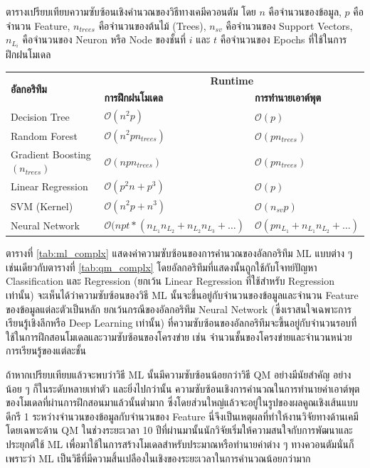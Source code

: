 \begin{adjustwidth}{-2.5 cm}{-2.5 cm}
    \centering
    \begin{threeparttable}[H]
    \caption{ตารางเปรียบเทียบความซับซ้อนเชิงคำนวณของวิธีทางเคมีควอนตัม\autocite{zotero-328} โดย $n$ คือจำนวนของข้อมูล, $p$ 
    คือจำนวน Feature, $n_{trees}$ คือจำนวนของต้นไม้ (Trees), $n_{sv}$ คือจำนวนของ Support Vectors, $n_{L_{i}}$ 
    คือจำนวนของ Neuron หรือ Node ของชั้นที่ $i$ และ $t$ คือจำนวนของ Epochs ที่ใช้ในการฝึกฝนโมเดล}
    \label{tab:ml_complx}
    \small
    \begin{tabular}{lll}\toprule
    \multirow{2}{*}{\textbf{อัลกอริทึม}} &\multicolumn{2}{c}{\textbf{Runtime}} \\\cmidrule{2-3}
    &\textbf{การฝึกฝนโมเดล} &\textbf{การทำนายเอาต์พุต}\\\midrule
    Decision Tree &$\mathcal{O}(n^{2}p)$ &$\mathcal{O}(p)$ \\
    Random Forest &$\mathcal{O}(n^{2}pn_{trees})$ &$\mathcal{O}(pn_{trees})$ \\
    Gradient Boosting $(n_{trees})$ &$\mathcal{O}(npn_{trees})$ &$\mathcal{O}(pn_{trees})$ \\
    Linear Regression &$\mathcal{O}(p^{2}n+p^{3})$ &$\mathcal{O}(p)$ \\
    SVM (Kernel) &$\mathcal{O}(n^{2}p+n^{3})$ &$\mathcal{O}(n_{sv}p)$ \\
    Neural Network &$\mathcal{O}(npt*(n_{L_{1}}n_{L_{2}}+ n_{L_{2}}n_{L_{3}} + \dots)$ &$\mathcal{O}(pn_{L_{1}} 
    + n_{L_{1}}n_{L_{2}}+ \dots)$ \\
    \bottomrule
    \end{tabular}
\end{threeparttable}
\end{adjustwidth}

ตารางที่ \ref{tab:ml_complx} แสดงค่าความซับซ้อนของการคำนวณของอัลกอริทึม ML แบบต่าง ๆ เช่นเดียวกับตารางที่ \ref{tab:qm_complx} โดยอัลกอริทึมที่แสดงนั้นถูกใช้กับโจทย์ปัญหา Classification และ Regression (ยกเว้น Linear Regression ที่ใช้สำหรับ Regression เท่านั้น) จะเห็นได้ว่าความซับซ้อนของวิธี ML นั้นจะขึ้นอยู่กับจำนวนของข้อมูลและจำนวน Feature ของข้อมูลแต่ละตัวเป็นหลัก ยกเว้นกรณีของอัลกอริทึม Neural Network (ซึ่งเราสนใจเฉพาะการเรียนรู้เชิงลึกหรือ Deep Learning เท่านั้น) ที่ความซับซ้อนของอัลกอริทึมจะขึ้นอยู่กับจำนวนรอบที่ใช้ในการฝึกสอนโมเดลและวามซับซ้อนของโครงข่าย เช่น จำนวนชั้นของโครงข่ายและจำนวนหน่วยการเรียนรู้ของแต่ละชั้น

ถ้าหากเปรียบเทียบแล้วจะพบว่าวิธี ML นั้นมีความซับซ้อนน้อยกว่าวิธี QM อย่างมีนัยสำคัญ อย่างน้อย ๆ ก็ในระดับหลายเท่าตัว และยิ่งไปกว่านั้น ความซับซ้อนเชิงการคำนวณในการทำนายค่าเอาต์พุตของโมเดลที่ผ่านการฝึกสอนมาแล้วนั้นต่ำมาก ซึ่งโดยส่วนใหญ่แล้วจะอยู่ในรูปของผลคูณเชิงเส้นแบบดีกรี 1 ระหว่างจำนวนของข้อมูลกับจำนวนของ Feature นี่จึงเป็นเหตุผลที่ทำให้งานวิจัยทางด้านเคมีโดยเฉพาะด้าน QM ในช่วงระยะเวลา 10 ปีที่ผ่านมานั้นนักวิจัยเริ่มให้ความสนใจกับการพัฒนาและประยุกต์ใช้ ML เพื่อมาใช้ในการสร้างโมเดลสำหรับประมาณหรือทำนายค่าต่าง ๆ ทางควอนตัมนั่นก็เพราะว่า ML เป็นวิธีที่มีความสิ้นเปลืองในเชิงของระยะเวลาในการคำนวณน้อยกว่ามาก\autocite{baum2021,mowbray2022,rodriguez-perez2022}

